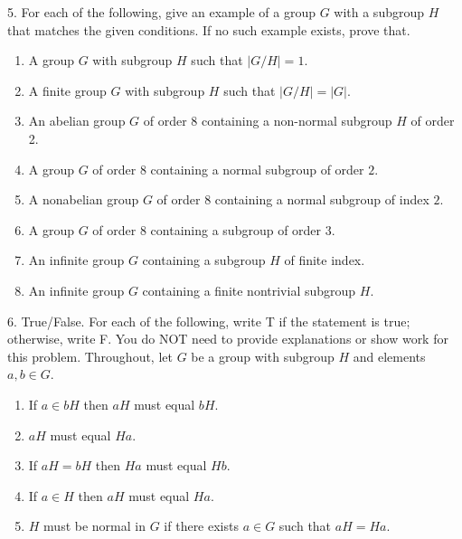 \documentclass[10pt,]{book}
\theoremstyle{plain}
\theoremstyle{definition}
\theoremstyle{definition}
\theoremstyle{definition}
\theoremstyle{definition}
\numberwithin{equation}{section}
\begin{document}
\begin{exerciselist}
\begin{enumerate}[label=(\alph*)]
\end{enumerate}
\par\smallskip
\item[5.]\hypertarget{exercise-54}{}For each of the following, give an example of a group \(G\) with a subgroup \(H\) that matches the given conditions. If no such example exists, prove that. \leavevmode%
\begin{enumerate}[label=(\alph*)]
\item\hypertarget{li-437}{}A group \(G\) with subgroup \(H\) such that \(|G/H|=1\).%
\item\hypertarget{li-438}{}A finite group \(G\) with subgroup \(H\) such that \(|G/H|=|G|\).%
\item\hypertarget{li-439}{}An abelian group \(G\) of order \(8\) containing a non-normal subgroup \(H\) of order 2.%
\item\hypertarget{li-440}{}A group \(G\) of order 8 containing a normal subgroup of order \(2\).%
\item\hypertarget{li-441}{}A nonabelian group \(G\) of order 8 containing a normal subgroup of index \(2\).%
\item\hypertarget{li-442}{}A group \(G\) of order 8 containing a subgroup of order \(3\).%
\item\hypertarget{li-443}{}An infinite group \(G\) containing a subgroup \(H\) of finite index.%
\item\hypertarget{li-444}{}An infinite group \(G\) containing a finite nontrivial subgroup \(H\).%
\end{enumerate}
%
\par\smallskip
\item[6.]\hypertarget{exercise-55}{}True/False. For each of the following, write T if the statement is true; otherwise, write F. You do NOT need to provide explanations or show work for this problem. Throughout, let \(G\) be a group with subgroup \(H\) and elements \(a,b\in G\). \leavevmode%
\begin{enumerate}[label=(\alph*)]
\item\hypertarget{li-453}{}If \(a\in bH\) then \(aH\) must equal \(bH\).%
\item\hypertarget{li-454}{}\(aH\) must equal \(Ha\).%
\item\hypertarget{li-455}{}If \(aH=bH\) then \(Ha\) must equal \(Hb\).%
\item\hypertarget{li-456}{}If \(a\in H\) then \(aH\) must equal \(Ha\).%
\item\hypertarget{li-457}{}\(H\) must be normal in \(G\) if there exists \(a\in G\) such that \(aH=Ha\).%

\end{enumerate}
\end{exerciselist}
\end{document}
